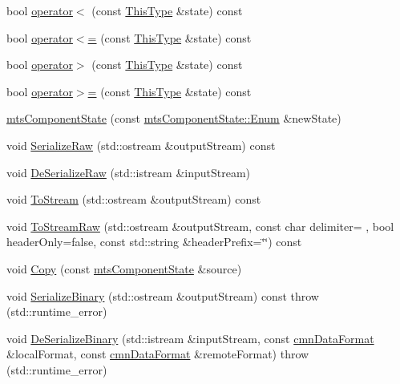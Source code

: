 \begin{DoxyCompactItemize}
bool \hyperlink{classmts_component_state_a54b72ce4c76fa7a03d4a98034d60a0ba}{operator$<$} (const \hyperlink{classmts_component_state_a668efaf1bf3c84a5448587f04d7312b5}{This\+Type} \&state) const 
\item 
bool \hyperlink{classmts_component_state_ae149358392cd85905993ea1998e90a71}{operator$<$=} (const \hyperlink{classmts_component_state_a668efaf1bf3c84a5448587f04d7312b5}{This\+Type} \&state) const 
\item 
bool \hyperlink{classmts_component_state_a45664f92ca298f7dde6515b3b9c7e417}{operator$>$} (const \hyperlink{classmts_component_state_a668efaf1bf3c84a5448587f04d7312b5}{This\+Type} \&state) const 
\item 
bool \hyperlink{classmts_component_state_aab2851a3e9ac31bc4395ea8101cae73b}{operator$>$=} (const \hyperlink{classmts_component_state_a668efaf1bf3c84a5448587f04d7312b5}{This\+Type} \&state) const 
\item 
\hyperlink{classmts_component_state_aeaa1d25fc7ba8fa4de98a4a3e340d02a}{mts\+Component\+State} (const \hyperlink{classmts_component_state_a1158e4d2d79fff671354909e87f58928}{mts\+Component\+State\+::\+Enum} \&new\+State)
\item 
void \hyperlink{classmts_component_state_a4d328200a2f9185b1451725909f9f793}{Serialize\+Raw} (std\+::ostream \&output\+Stream) const 
\item 
void \hyperlink{classmts_component_state_a7437a5e0391ac0ba24c3b30990bf2b3f}{De\+Serialize\+Raw} (std\+::istream \&input\+Stream)
\item 
void \hyperlink{classmts_component_state_a7dd43d11ff1ebd0804c1211591c46484}{To\+Stream} (std\+::ostream \&output\+Stream) const 
\item 
void \hyperlink{classmts_component_state_a10b31cd7c1c66442040c65ba97de011a}{To\+Stream\+Raw} (std\+::ostream \&output\+Stream, const char delimiter= \textquotesingle{} \textquotesingle{}, bool header\+Only=false, const std\+::string \&header\+Prefix=\char`\"{}\char`\"{}) const 
\item 
void \hyperlink{classmts_component_state_ab1add6489caa0e859e57cff25d993980}{Copy} (const \hyperlink{classmts_component_state}{mts\+Component\+State} \&source)
\item 
void \hyperlink{classmts_component_state_a9f938ded40257344be1125497c1adac3}{Serialize\+Binary} (std\+::ostream \&output\+Stream) const   throw (std\+::runtime\+\_\+error)
\item 
void \hyperlink{classmts_component_state_a8d79212ec7a9b187187ab598c735f544}{De\+Serialize\+Binary} (std\+::istream \&input\+Stream, const \hyperlink{classcmn_data_format}{cmn\+Data\+Format} \&local\+Format, const \hyperlink{classcmn_data_format}{cmn\+Data\+Format} \&remote\+Format)  throw (std\+::runtime\+\_\+error)

\end{DoxyCompactItemize}
